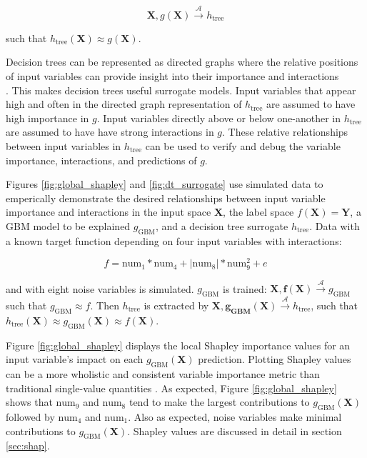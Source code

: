 \documentclass{article}
\begin{document}
\begin{equation}
\mathbf{X}, g(\mathbf{X}) \xrightarrow{\mathcal{A}} h_{\text{tree}}
\end{equation}

such that $h_{\text{tree}}(\mathbf{X}) \approx g(\mathbf{X})$. 

Decision trees can be represented as directed graphs where the relative positions of input variables can provide insight into their importance and interactions \\ \cite{cart}. This makes decision trees useful surrogate models. Input variables that appear high and often in the directed graph representation of $h_{\text{tree}}$ are assumed to have high importance in $g$. Input variables directly above or below one-another in $h_{\text{tree}}$ are assumed to have have strong interactions in $g$. These relative relationships between input variables in $h_{\text{tree}}$ can be used to verify and debug the variable importance, interactions, and predictions of $g$.

Figures \ref{fig:global_shapley} and \ref{fig:dt_surrogate} use simulated data to emperically demonstrate the desired relationships between input variable importance and interactions in the input space $\mathbf{X}$, the label space $f(\mathbf{X}) = \mathbf{Y}$, a GBM model to be explained $g_{\text{GBM}}$, and a decision tree surrogate $h_{\text{tree}}$. Data with a known target function depending on four input variables with interactions: 

\begin{equation}
\label{eq:f}
f = \text{num} _1 * \text{num}_4 + |\text{num}_8| * \text{num}_9^2 + e
\end{equation}

and with eight noise variables is simulated. $g_{\text{GBM}}$ is trained: $ \mathbf{X}, \mathbf{f(X)} \xrightarrow{\mathcal{A}} g_{\text{GBM}}$ such that $g_{\text{GBM}} \approx f$. Then $h_{\text{tree}}$ is extracted by $\mathbf{X}, \mathbf{g_{\text{GBM}}(X)} \xrightarrow{\mathcal{A}} h_{\text{tree}}$, such that $h_{\text{tree}}(\mathbf{X}) \approx g_{\text{GBM}}(\mathbf{X}) \approx f(\mathbf{X})$.

Figure \ref{fig:global_shapley} displays the local Shapley importance values for an input variable's impact on each $g_{\text{GBM}}(\mathbf{X})$ prediction. Plotting Shapley values can be a more wholistic and consistent variable importance metric than traditional single-value quantities \cite{shapley}. As expected, Figure \ref{fig:global_shapley} shows that $\text{num}_9$ and $\text{num}_8$ tend to make the largest contributions to $g_{\text{GBM}}(\mathbf{X})$ followed by $\text{num}_4$ and $\text{num}_1$. Also as expected, noise variables make minimal contributions to $g_{\text{GBM}}(\mathbf{X})$. Shapley values are discussed in detail in section \ref{sec:shap}.
\end{document}
